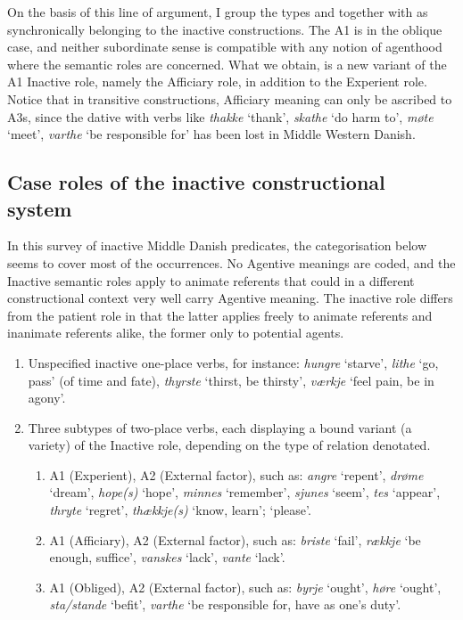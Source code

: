 \documentclass[output=paper]{langscibook}
\begin{document}
On the basis of this line of argument, I group the types  and  together with  as synchronically belonging to the inactive constructions. The A1 is in the oblique case, and neither subordinate sense is compatible with any notion of agenthood where the semantic roles are concerned. What we obtain, is a new variant of the A1 Inactive role, namely the Afficiary role, in addition to the Experient role. Notice that in transitive constructions, Afficiary meaning can only be ascribed to A3s, since the dative with verbs like \textit{thakke} ‘thank', \textit{skathe} ‘do harm to', \textit{møte} ‘meet', \textit{varthe} ‘be responsible for' has been lost in Middle Western Danish.

\subsection{Case roles of the inactive constructional system} \label{heltoft:2.6}

In this survey of inactive Middle Danish predicates, the categorisation below seems to cover most of the occurrences. No Agentive meanings are coded, and the Inactive semantic roles apply to animate referents that could in a different constructional context very well carry Agentive meaning. The inactive role differs from the patient role in that the latter applies freely to animate referents and inanimate referents alike, the former only to potential agents.

\begin{enumerate}
    \item Unspecified inactive one-place verbs, for instance: \textit{hungre} ‘starve', \textit{lithe} ‘go, pass' (of time and fate), \textit{thyrste} ‘thirst, be thirsty', \textit{værkje} ‘feel pain, be in agony'.
    \item Three subtypes of two-place verbs, each displaying a bound variant (a variety) of the Inactive role, depending on the type of relation denotated.
    \begin{enumerate}
        \item A1 (Experient), A2 (External factor), such as: \textit{angre}  ‘repent', \textit{drøme} ‘dream', \textit{hope(s)} ‘hope', \textit{minnes} ‘remember', \textit{sjunes} ‘seem', \textit{tes} ‘appear', \textit{thryte} ‘regret', \textit{thækkje(s)} ‘know, learn'; ‘please'.
        \item A1 (Afficiary), A2 (External factor), such as: \textit{briste} ‘fail', \textit{rækkje} ‘be enough, suffice', \textit{vanskes} ‘lack', \textit{vante} ‘lack'.
        \item A1 (Obliged), A2 (External factor), such as: \textit{byrje} ‘ought', \textit{høre} ‘ought', \textit{sta/stande} ‘befit', \textit{varthe} ‘be responsible for, have as one's duty'.
    \end{enumerate}
\end{enumerate}
\end{document}
